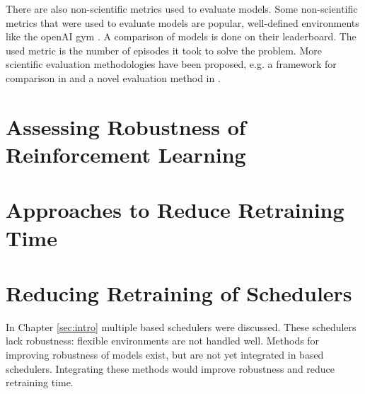 There are also non-scientific metrics used to evaluate \rl models. Some
non-scientific metrics that were used to evaluate \rl models are popular,
well-defined environments like the openAI gym \cite{gym2016}. A comparison of
\rl models is done on their
leaderboard. The used metric
is the number of episodes it took to solve the problem. More scientific
evaluation methodologies have been proposed, e.g. a framework for comparison
in  and a novel evaluation method in .

\section{Assessing Robustness of Reinforcement Learning}




\section{Approaches to Reduce Retraining Time}



\section{Reducing Retraining of Schedulers}
 In Chapter \ref{sec:intro} multiple \rl based schedulers were
discussed. These schedulers lack robustness: flexible environments are not
handled well. Methods for improving robustness of \rl models exist, but are not
yet integrated in \rl based schedulers. Integrating these methods would improve
robustness and reduce retraining time.
